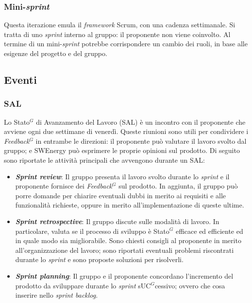 \subsubsection{Mini-\textit{sprint}}
Questa iterazione emula il \textit{framework} Scrum, con una cadenza
settimanale. Si tratta di uno \textit{sprint}
interno al gruppo: il proponente non viene coinvolto. Al termine di un
mini-\textit{sprint} potrebbe corrispondere un cambio dei ruoli, in base alle
esigenze del progetto e del gruppo.

\subsection{Eventi}

\subsubsection{SAL}
Lo \gls{Stato}$^G$ di Avanzamento del Lavoro (SAL) è un incontro con il proponente che
avviene ogni due settimane di venerdì. Queste riunioni sono utili per
condividere i \textit{\gls{Feedback}$^G$} in entrambe le direzioni: il proponente può
valutare il lavoro svolto dal gruppo; e SWEnergy può esprimere le proprie
opinioni sul prodotto. Di seguito sono riportate le attività principali che
avvengono durante un SAL:

\begin{itemize}
	\item \textbf{\textit{Sprint review}}: Il gruppo presenta il lavoro svolto
	      durante lo
	      \textit{sprint} e il proponente fornisce dei \textit{\gls{Feedback}$^G$} sul
	      prodotto. In aggiunta, il gruppo può porre domande per chiarire
	      eventuali dubbi in merito ai requisiti e alle funzionalità richieste,
	      oppure in merito all'implementazione di queste ultime.

	\item \textbf{\textit{Sprint retrospective}}: Il gruppo discute sulle modalità
	      di lavoro. In particolare, valuta se il processo di sviluppo
	      è \gls{Stato}$^G$ efficace ed efficiente ed in quale modo sia migliorabile.
	      Sono chiesti consigli al proponente in merito all'organizzazione del
	      lavoro; sono riportati eventuali problemi riscontrati durante lo
	      \textit{sprint} e sono proposte soluzioni per risolverli.

	\item \textbf{\textit{Sprint planning}}: Il gruppo e il proponente concordano
	      l'incremento del prodotto da sviluppare durante lo \textit{sprint}
	      s\gls{UC}$^G$cessivo; ovvero che cosa inserire nello \textit{sprint backlog}.
\end{itemize}

